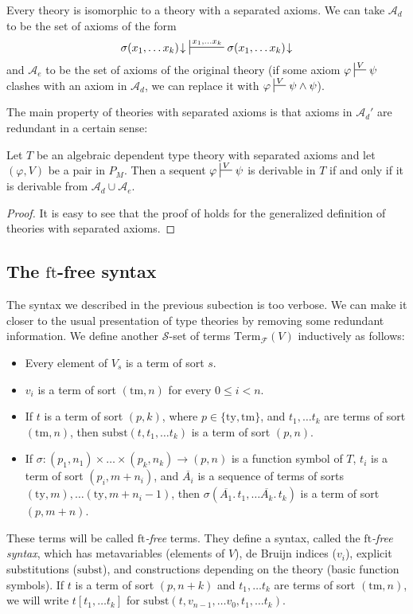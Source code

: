 \documentclass[reqno]{amsart}
\theoremstyle{definition}
\theoremstyle{remark}
\newcommand{\fs}[1]{\mathrm{#1}}
\newcommand{\Term}{\fs{Term}}
\newcommand{\subst}{\fs{subst}}
\newcommand{\ft}{\fs{ft}}
\newcommand{\ty}{\fs{ty}}
\newcommand{\tm}{\fs{tm}}
\numberwithin{figure}{section}
\begin{document}
\begin{remark}
Every theory is isomorphic to a theory with a separated axioms.
We can take $\mathcal{A}_d$ to be the set of axioms of the form
\[ \sigma(x_1, \ldots x_k)\!\downarrow\ \sststile{}{x_1, \ldots x_k} \sigma(x_1, \ldots x_k)\!\downarrow \]
and $\mathcal{A}_e$ to be the set of axioms of the original theory (if some axiom $\varphi \sststile{}{V} \psi$ clashes with an axiom in $\mathcal{A}_d$, we can replace it with $\varphi \sststile{}{V} \psi \land \psi$).
\end{remark}

The main property of theories with separated axioms is that axioms in $\mathcal{A}_d'$ are redundant in a certain sense:

\begin{prop}
Let $T$ be an algebraic dependent type theory with separated axioms and let $(\varphi,V)$ be a pair in $P_M$.
Then a sequent $\varphi \sststile{}{V} \psi$ is derivable in $T$ if and only if it is derivable from $\mathcal{A}_d \cup \mathcal{A}_e$.
\end{prop}
\begin{proof}
It is easy to see that the proof of \cite[Proposition~5.3]{morita-equiv} holds for the generalized definition of theories with separated axioms.
\end{proof}

\subsection{The $\ft$-free syntax}
\label{sec:contexts}

The syntax we described in the previous subection is too verbose.
We can make it closer to the usual presentation of type theories by removing some redundant information.
We define another $\mathcal{S}$-set of terms $\Term_\mathcal{F}(V)$ inductively as follows:
\begin{itemize}
\item Every element of $V_s$ is a term of sort $s$.
\item $v_i$ is a term of sort $(\tm,n)$ for every $0 \leq i < n$.
\item If $t$ is a term of sort $(p,k)$, where $p \in \{ \ty, \tm \}$, and $t_1, \ldots t_k$ are terms of sort $(\tm,n)$, then $\subst(t, t_1, \ldots t_k)$ is a term of sort $(p,n)$.
\item If $\sigma : (p_1,n_1) \times \ldots \times (p_k,n_k) \to (p,n)$ is a function symbol of $T$, $t_i$ is a term of sort $(p_i,m+n_i)$, and $\overline{A_i}$ is a sequence of terms of sorts $(\ty,m), \ldots (\ty,m+n_i-1)$, then $\sigma(\overline{A_1}.\,t_1, \ldots \overline{A_k}.\,t_k)$ is a term of sort $(p,m+n)$.
\end{itemize}
These terms will be called \emph{$\ft$-free} terms.
They define a syntax, called the \emph{$\ft$-free syntax}, which has metavariables (elements of $V$), de Bruijn indices ($v_i$), explicit substitutions ($\subst$), and constructions depending on the theory (basic function symbols).
If $t$ is a term of sort $(p,n+k)$ and $t_1, \ldots t_k$ are terms of sort $(\tm,n)$, we will write $t[t_1, \ldots t_k]$ for $\subst(t, v_{n-1}, \ldots v_0, t_1, \ldots t_k)$.
\end{document}

